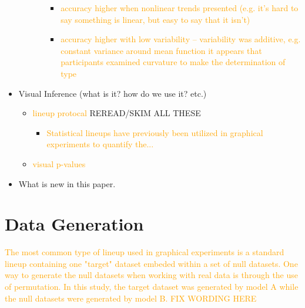 \documentclass[]{interact}
\theoremstyle{plain}%
\theoremstyle{definition}
\theoremstyle{remark}
\def\tightlist{}
\begin{document}
\begin{itemize}
\begin{itemize}
\begin{itemize}
      \begin{itemize}
      \item
        \textcolor{Orange}{accuracy higher when nonlinear trends presented (e.g. it’s hard to say something is linear, but easy to say that it isn’t)}
      \item
        \textcolor{Orange}{accuracy higher with low variability – variability was additive, e.g. constant variance around mean function it appears that participants examined curvature to make the determination of type}
      \end{itemize}
    \end{itemize}
  \end{itemize}
\item
  Visual Inference (what is it? how do we use it? etc.)

  \begin{itemize}
  \tightlist
  \item
    \textcolor{Orange}{lineup protocal}
    \citep[\citet{wickham2010graphical}, \citet{hofmann_graphical_2012},
    \citet{majumder_validation_2013},
    \citet{vanderplas_clusters_2017}]{buja_statistical_2009} REREAD/SKIM
    ALL THESE

    \begin{itemize}
    \item
      \textcolor{Orange}{Statistical lineups have previously been utilized in graphical experiments to quantify the...}
    \end{itemize}
  \item
    \textcolor{Orange}{visual p-values}
    \citep{vanderplas_statistical_nodate}
  \end{itemize}
\item
  What is new in this paper.
\end{itemize}

\hypertarget{data-generation}{%
\section{Data Generation}\label{data-generation}}

\textcolor{Orange}{The most common type of lineup used in graphical experiments is a standard lineup containing one "target" dataset embeded within a set of null datasets. One way to generate the null datasets when working with real data is through the use of permutation. In this study, the target dataset was generated by model A while the null datasets were generated by model B. FIX WORDING HERE}
\end{document}
